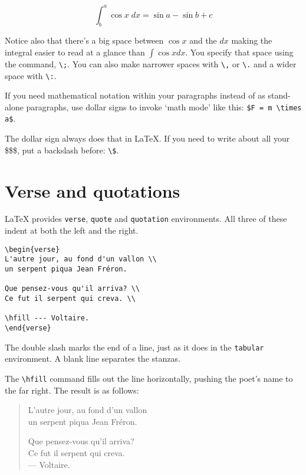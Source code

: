 \begin{equation}
	\int^a_b \cos x\; dx = \sin a - \sin b + c
\end{equation}

Notice also that there's a big space between $\cos x$ and the $dx$ making the integral easier to read at a glance than $\int\cos x dx$. You specify that space using the command, \verb|\;|. You can also make narrower spaces with \verb|\,| or \verb|\.| and a wider space with \verb|\:|.

If you need mathematical notation within your paragraphs instead of as stand-alone paragraphs, use dollar signs to invoke `math mode' like this:  \verb|$F = m \times a$|.

The dollar sign always does that in LaTeX. If you need to write about all your \$\$\$, put a backslash before: \verb|\$|.


\section{Verse and quotations}

LaTeX provides \texttt{verse}, \texttt{quote} and \texttt{quotation} environments. All three of these indent at both the left and the right.

\begin{verbatim}
\begin{verse}
L'autre jour, au fond d'un vallon \\
un serpent piqua Jean Fréron.

Que pensez-vous qu'il arriva? \\
Ce fut il serpent qui creva. \\

\hfill --- Voltaire.
\end{verse}
\end{verbatim}

The double slash marks the end of a line, just as it does in the \texttt{tabular} environment. A blank line separates the stanzas.

The \verb+\hfill+ command fills out the line horizontally, pushing the poet's name to the far right.  The result is as follows:

\begin{verse}
L'autre jour, au fond d'un vallon \\
un serpent piqua Jean Fréron.

Que pensez-vous qu'il arriva? \\
Ce fut il serpent qui creva. \\

\hfill --- Voltaire.
\end{verse}

